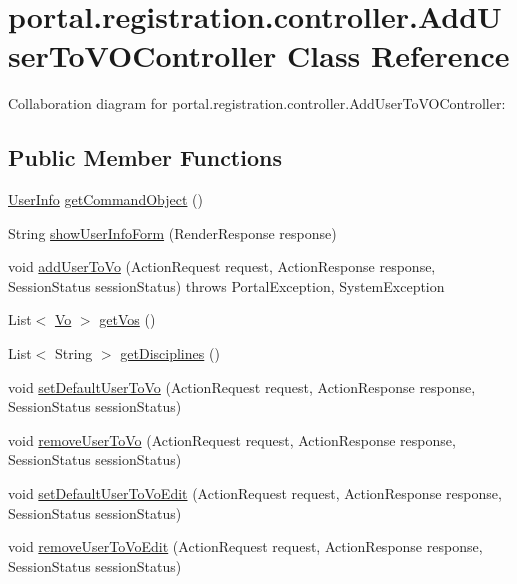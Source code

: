 \hypertarget{classportal_1_1registration_1_1controller_1_1AddUserToVOController}{
\section{portal.registration.controller.AddUserToVOController Class Reference}
\label{classportal_1_1registration_1_1controller_1_1AddUserToVOController}
}


Collaboration diagram for portal.registration.controller.AddUserToVOController:
\subsection*{Public Member Functions}
\begin{DoxyCompactItemize}
\item 
\hyperlink{classportal_1_1registration_1_1domain_1_1UserInfo}{UserInfo} \hyperlink{classportal_1_1registration_1_1controller_1_1AddUserToVOController_ada7bd669356fb2275d4d55a041d4c62b}{getCommandObject} ()
\item 
String \hyperlink{classportal_1_1registration_1_1controller_1_1AddUserToVOController_a295f242a6ecc2499f190de9566233cbd}{showUserInfoForm} (RenderResponse response)
\item 
void \hyperlink{classportal_1_1registration_1_1controller_1_1AddUserToVOController_a299d78081b72ac80a2adba3f33c7970c}{addUserToVo} (ActionRequest request, ActionResponse response, SessionStatus sessionStatus)  throws PortalException, 			SystemException 
\item 
List$<$ \hyperlink{classportal_1_1registration_1_1domain_1_1Vo}{Vo} $>$ \hyperlink{classportal_1_1registration_1_1controller_1_1AddUserToVOController_a2d973344b8dd050056ca0eb6577d3129}{getVos} ()
\item 
List$<$ String $>$ \hyperlink{classportal_1_1registration_1_1controller_1_1AddUserToVOController_a29a2dc59f8d0b0f2abc5e2bc1ff00d0b}{getDisciplines} ()
\item 
void \hyperlink{classportal_1_1registration_1_1controller_1_1AddUserToVOController_a57a44676aa98d8f479812586e40b0d29}{setDefaultUserToVo} (ActionRequest request, ActionResponse response, SessionStatus sessionStatus)
\item 
void \hyperlink{classportal_1_1registration_1_1controller_1_1AddUserToVOController_ac000f6bd6a7d3feb815b0df00d919e79}{removeUserToVo} (ActionRequest request, ActionResponse response, SessionStatus sessionStatus)
\item 
void \hyperlink{classportal_1_1registration_1_1controller_1_1AddUserToVOController_aeeb052d81e475bcbdc3b8cfce49cb819}{setDefaultUserToVoEdit} (ActionRequest request, ActionResponse response, SessionStatus sessionStatus)
\item 
void \hyperlink{classportal_1_1registration_1_1controller_1_1AddUserToVOController_a99b8d1de74cee992c19354ae506e6e1f}{removeUserToVoEdit} (ActionRequest request, ActionResponse response, SessionStatus sessionStatus)
\end{DoxyCompactItemize}
